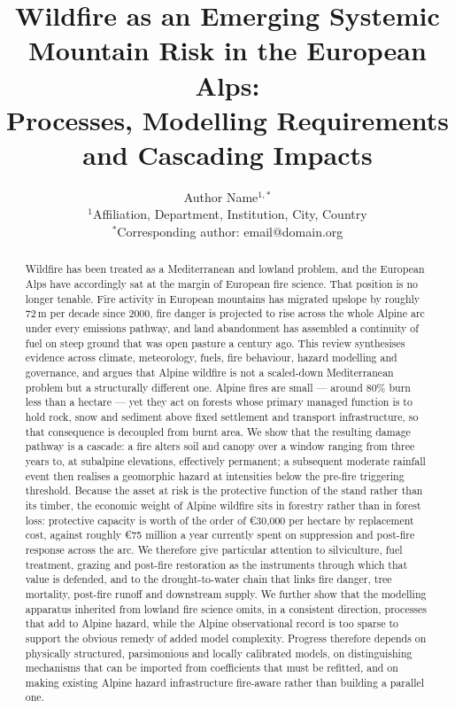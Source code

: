 \documentclass[11pt,a4paper]{article}
\title{
Wildfire as an Emerging Systemic Mountain Risk in the European Alps:\\
Processes, Modelling Requirements and Cascading Impacts
}
\author{
Author Name$^{1,*}$ \\
\small $^{1}$Affiliation, Department, Institution, City, Country \\
\small $^{*}$Corresponding author: email@domain.org
}
\date{}
\begin{document}
\maketitle


\begin{abstract}
\noindent
Wildfire has been treated as a Mediterranean and lowland problem, and the European Alps have accordingly sat at the margin of European fire science. That position is no longer tenable. Fire activity in European mountains has migrated upslope by roughly 72\,m per decade since 2000, fire danger is projected to rise across the whole Alpine arc under every emissions pathway, and land abandonment has assembled a continuity of fuel on steep ground that was open pasture a century ago. This review synthesises evidence across climate, meteorology, fuels, fire behaviour, hazard modelling and governance, and argues that Alpine wildfire is not a scaled-down Mediterranean problem but a structurally different one. Alpine fires are small --- around 80\% burn less than a hectare --- yet they act on forests whose primary managed function is to hold rock, snow and sediment above fixed settlement and transport infrastructure, so that consequence is decoupled from burnt area. We show that the resulting damage pathway is a cascade: a fire alters soil and canopy over a window ranging from three years to, at subalpine elevations, effectively permanent; a subsequent moderate rainfall event then realises a geomorphic hazard at intensities below the pre-fire triggering threshold. Because the asset at risk is the protective function of the stand rather than its timber, the economic weight of Alpine wildfire sits in forestry rather than in forest loss: protective capacity is worth of the order of €30{,}000 per hectare by replacement cost, against roughly €75 million a year currently spent on suppression and post-fire response across the arc. We therefore give particular attention to silviculture, fuel treatment, grazing and post-fire restoration as the instruments through which that value is defended, and to the drought-to-water chain that links fire danger, tree mortality, post-fire runoff and downstream supply. We further show that the modelling apparatus inherited from lowland fire science omits, in a consistent direction, processes that add to Alpine hazard, while the Alpine observational record is too sparse to support the obvious remedy of added model complexity. Progress therefore depends on physically structured, parsimonious and locally calibrated models, on distinguishing mechanisms that can be imported from coefficients that must be refitted, and on making existing Alpine hazard infrastructure fire-aware rather than building a parallel one.
\end{abstract}
\end{document}
